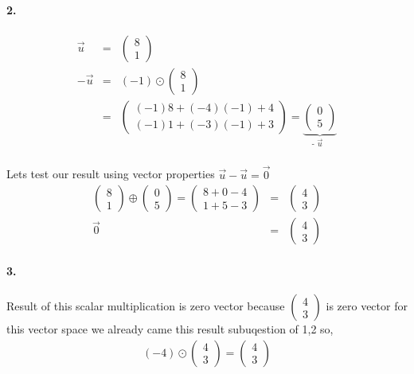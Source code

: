\documentclass[11pt]{article}
\begin{document}
\paragraph{2.}
\begin{eqnarray*}
\vec{u}
&=&
\begin{pmatrix}
8\\
1
\end{pmatrix}
\\
-\vec{u}
&=&
(-1)
\odot
\begin{pmatrix}
8\\
1
\end{pmatrix}
\\
&=&
\begin{pmatrix}
(-1)8+(-4)(-1)+4\\
(-1)1+(-3)(-1)+3
\end{pmatrix}
=
\underbrace{
\begin{pmatrix}
0\\
5
\end{pmatrix}
}_\text{- $\vec{u}$ }
\end{eqnarray*}
\paragraph{}Lets test our result using vector properties $\vec{u}-\vec{u}=\vec{0}$
\begin{eqnarray*}
\begin{pmatrix}
8\\
1
\end{pmatrix}
\oplus
\begin{pmatrix}
0\\
5
\end{pmatrix}
=
\begin{pmatrix}
8+0-4\\
1+5-3
\end{pmatrix}
&=&
\begin{pmatrix}
4\\
3
\end{pmatrix}
\\
\vec{0}
&=&
\begin{pmatrix}
4\\
3
\end{pmatrix}
\end{eqnarray*}
\paragraph{3.}Result of this scalar multiplication is zero vector because 
$
\begin{pmatrix}
4\\
3
\end{pmatrix}
$
is zero vector for this vector space we already came this result subuqestion of 1,2 so,
\begin{eqnarray*}
(-4)
\odot
\begin{pmatrix}
4\\
3
\end{pmatrix}
=
\begin{pmatrix}
4\\
3
\end{pmatrix}
\end{eqnarray*}
\end{document}
